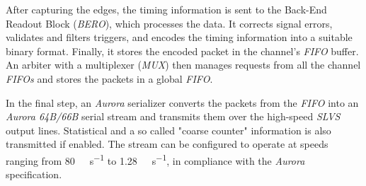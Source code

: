 After capturing the edges, the timing information is sent to the Back-End Readout Block (\emph{BERO}), which processes the data. It corrects signal errors, validates and filters triggers, and encodes the timing information into a suitable binary format. Finally, it stores the encoded packet in the channel's \emph{FIFO} buffer. An arbiter with a multiplexer (\emph{MUX}) then manages requests from all the channel \emph{FIFOs} and stores the packets in a global \emph{FIFO}. \cite{ficDatasheet}

In the final step, an \emph{Aurora} serializer converts the packets from the \emph{FIFO} into an \emph{Aurora 64B/66B} serial stream and transmits them over the high-speed \emph{SLVS} output lines. Statistical and a so called "coarse counter" information is also transmitted if enabled. The stream can be configured to operate at speeds ranging from \SI{80}{\mega\bit\per\second} to \SI{1.28}{\giga\bit\per\second}, in compliance with the \emph{Aurora} specification. \cite{ficDatasheet}\cite{auroraSpec}


